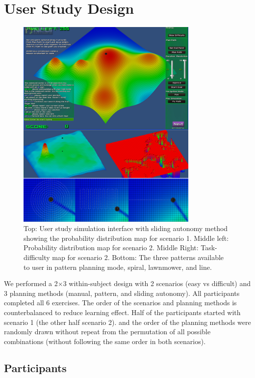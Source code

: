 \documentclass[lettersize, apacite, twoside, HRI]{apa_HRI}
\begin{document}
\section{User Study Design} 
\label{sec:Design}

\begin{figure}
\centering
\includegraphics[width=3.5in]{UserStudy.JPG}
\caption{Top: User study simulation interface with sliding autonomy method showing the probability distribution map for scenario 1. Middle left: Probability distribution map for scenario 2. Middle Right: Task-difficulty map for scenario 2. Bottom: The three patterns available to user in pattern planning mode, spiral, lawnmower, and line.}
\label{UserStudy}
\end{figure}

We performed a 2$\times$3 within-subject design with 2 scenarios (easy vs difficult) and 3 planning methods (manual, pattern, and sliding autonomy). All participants completed all 6 exercises. The order of the scenarios and planning methods is counterbalanced to reduce learning effect. Half of the participants started with scenario 1 (the other half scenario 2). and the order of the planning methods were randomly drawn without repeat from the permutation of all possible combinations (without following the same order in both scenarios).

\subsection{Participants}
\end{document}

